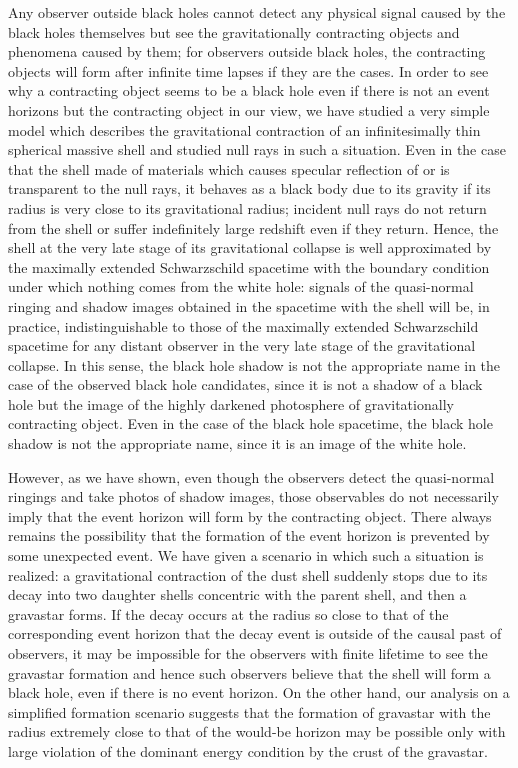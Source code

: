 \documentclass[aps,preprint,preprintnumber,nofootinbib,amsmath,amssymb,ascmac,bm,12pt]{revtex4}
\begin{document}
Any observer outside black holes cannot detect any physical signal caused by the 
black holes themselves but see the gravitationally contracting objects and phenomena 
caused by them; for  observers outside black holes, 
the contracting objects will form after infinite time lapses if they are the cases.  
In order to see why a contracting object seems to be a black hole even if 
there is not an event horizons but the contracting object in our view, 
we have studied a very simple model which describes the 
gravitational contraction of an infinitesimally thin spherical massive shell 
and studied null rays in such a situation. 
Even in the case that the shell made of materials which 
causes specular reflection of or is transparent to the null rays, 
it behaves as a black body due to its gravity if its radius is very close to its gravitational radius; 
incident null rays do not return from the shell or suffer indefinitely large redshift even if they return. 
Hence, the shell at the very late stage of its gravitational collapse is well approximated by the 
maximally extended Schwarzschild spacetime with the boundary condition 
under which nothing comes from the white hole: 
signals of the quasi-normal ringing and shadow images obtained in the spacetime with the 
shell will be, in practice, indistinguishable to those of the maximally extended Schwarzschild spacetime 
for any distant observer in the very late stage of the gravitational collapse. 
In this sense, the black hole shadow is not the appropriate name in the case of 
the observed black hole candidates, since it is not a shadow of a black hole 
but the image of the highly darkened photosphere of gravitationally contracting object. 
Even in the case of the black hole spacetime, the black hole shadow is not the appropriate name, 
since it is an image of the white hole.  

However, as we have shown, even though the observers detect the quasi-normal ringings 
and take photos of shadow images, those observables do not necessarily imply that 
the event horizon will form by the contracting object. There always remains the possibility 
that the formation of the event horizon is prevented by some unexpected event. 
We have given a scenario in which such a situation is realized: 
a gravitational contraction of the dust shell suddenly stops 
due to its decay into two daughter shells concentric 
with the parent shell, and then a gravastar forms. 
If the decay occurs at the radius so close to that of the corresponding event horizon that 
the decay event is outside of the causal past of observers, it may be impossible for the 
observers with finite lifetime to see the gravastar formation and hence such observers believe 
that the shell will form a black hole, even if there is no event horizon. 
On the other hand, our analysis on a simplified
formation scenario suggests that the formation of gravastar with the radius extremely close
to that of the would-be horizon may be possible only with large violation of the dominant
energy condition by the crust of the gravastar.  
\end{document}
